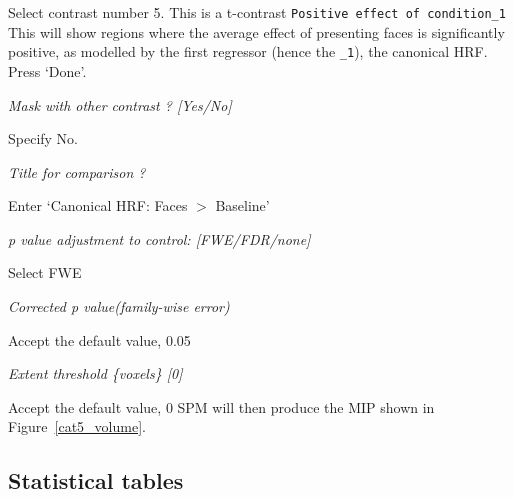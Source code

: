 \bi
\item{Select contrast number 5. This is a t-contrast \verb!Positive effect of condition_1! This will show 
regions where the average effect of presenting faces is significantly positive, as modelled by 
the first regressor (hence the \verb!_1!), the 
canonical HRF. Press `Done'.}
\item{\em Mask with other contrast ? [Yes/No]}
\item{Specify No.}
\item{\em Title for comparison ?}
\item{Enter `Canonical HRF: Faces $>$ Baseline'}
\item{\em p value adjustment to control: [FWE/FDR/none]}
\item{Select FWE}
\item{\em Corrected p value(family-wise error)}
\item{Accept the default value, 0.05}
\item{\em Extent threshold \{voxels\} [0]}
\item{Accept the default value, 0}
\ei
SPM will then produce the MIP shown in Figure~\ref{cat5_volume}.

\subsection{Statistical tables}

